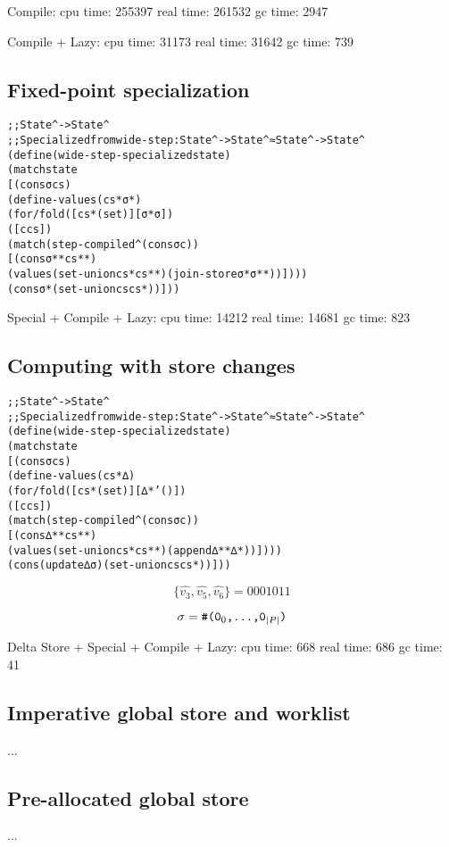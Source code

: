 \documentclass[preprint]{sigplanconf}
\begin{document}
Compile:
   cpu time: 255397 real time: 261532 gc time: 2947

\noindent
Compile + Lazy:
   cpu time: 31173 real time: 31642 gc time: 739

\newpage
\subsection{Fixed-point specialization}

\begin{alltt}
;; State^ -> State^
;; Specialized from wide-step : State^ -> { State^ } ≈ State^ -> State^
(define (wide-step-specialized state)
  (match state
    [(cons σ cs)
     (define-values (cs* σ*)
       (for/fold ([cs* (set)] [σ* σ])
         ([c cs])
         (match (step-compiled^ (cons σ c))
           [(cons σ** cs**)
            (values (set-union cs* cs**) (join-store σ* σ**))])))
     (cons σ* (set-union cs cs*))]))
\end{alltt}

Special + Compile + Lazy:
   cpu time: 14212 real time: 14681 gc time: 823

\subsection{Computing with store changes}

\begin{alltt}
;; State^ -> State^
;; Specialized from wide-step : State^ -> { State^ } ≈ State^ -> State^
(define (wide-step-specialized state)
  (match state
    [(cons σ cs)
     (define-values (cs* ∆)
       (for/fold ([cs* (set)] [∆* '()])
         ([c cs])
         (match (step-compiled^ (cons σ c))
           [(cons ∆** cs**)
            (values (set-union cs* cs**) (append ∆** ∆*))])))
     (cons (update ∆ σ) (set-union cs cs*))]))
\end{alltt}

\[
\{ \widehat{v_3}, \widehat{v_5}, \widehat{v_6} \} = 0001011
\]

\[
\sigma = \mbox{\tt \#(0$_0$,\dots,0$_{|P|}$)}
\]

Delta Store + Special + Compile + Lazy:
   cpu time: 668 real time: 686 gc time: 41

\subsection{Imperative global store and worklist}
...
\subsection{Pre-allocated global store}
...
\end{document}
